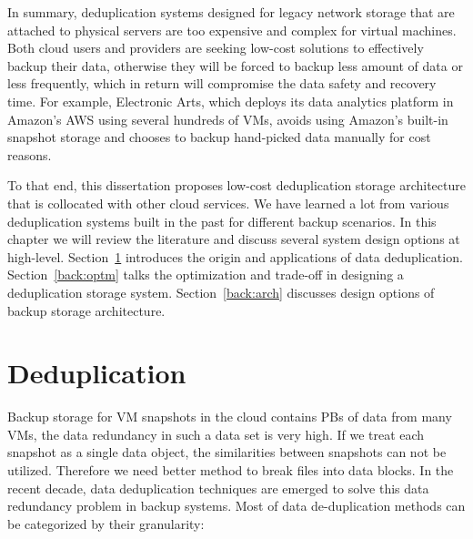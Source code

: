 In summary, deduplication systems designed for legacy network storage that are attached to
physical servers are too expensive and complex for virtual machines. 
Both cloud users and providers are seeking low-cost solutions to effectively backup
their data, otherwise they will be forced to backup less amount of data or less frequently,
which in return will compromise the data safety and recovery time. For example, Electronic Arts, which deploys
its data analytics platform in Amazon's AWS using several hundreds of VMs, 
avoids using Amazon's built-in snapshot storage and chooses to backup hand-picked data manually for cost reasons.

To that end, this dissertation proposes low-cost deduplication storage architecture that is
collocated with other cloud services. We have learned a lot from 
various deduplication systems built in the past for different backup scenarios. 
In this chapter we will review the literature and discuss several system design options at high-level.
Section~\ref{back:dedup} introduces the origin and applications of data deduplication.
Section~\ref{back:optm} talks the optimization and trade-off in designing a deduplication storage system.
Section~\ref{back:arch} discusses design options of backup storage architecture.

\section{Deduplication}
\label{back:dedup}
Backup storage for VM snapshots in the cloud contains PBs of data from many VMs,
the data redundancy in such a data set is very high\cite{Jayaram2011, agrawal07}.
If we treat each snapshot as a single data object, the similarities between snapshots
can not be utilized. Therefore we need better method to break files into data blocks.
In the recent decade, data deduplication techniques are emerged to solve this data
redundancy problem in backup systems.
Most of data de-duplication methods can be categorized by their granularity:


